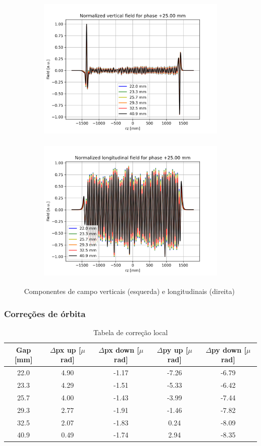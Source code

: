 \documentclass[a4paper,12pt]{article}
\begin{document}
\begin{figure}[H]
\begin{subfigure}{0.5\textwidth}
\includegraphics[width=0.9\linewidth, height=7cm]{figs/phase25 By.png} 
\label{fig:subim125}
\end{subfigure}
\begin{subfigure}{0.5\textwidth}
\includegraphics[width=0.9\linewidth, height=7cm]{figs/phase25 Bz.png}
\label{fig:subim225}
\end{subfigure}
\caption{Componentes de campo verticais (esquerda) e longitudinais (direita)}
\label{fig:by_bz_25}
\end{figure}

\subsubsection{Correções de órbita}

\begin{table}[H]
\centering
\caption{Tabela de correção local}
\begin{tabular}{|c|c|c|c|c|}
\hline
Gap {[}mm{]} & $\Delta$px up {[}$\mu$rad{]} & $\Delta$px down {[}$\mu$rad{]} & $\Delta$py up {[}$\mu$rad{]} & $\Delta$py down {[}$\mu$rad{]} \\ \hline
22.0 & 4.90 & -1.17 & -7.26 & -6.79 \\ \hline
23.3 & 4.29  & -1.51 & -5.33 & -6.42 \\ \hline
25.7 & 4.00  & -1.43 & -3.99 & -7.44 \\ \hline
29.3 & 2.77  & -1.91 & -1.46 & -7.82 \\ \hline
32.5 &  2.07 & -1.83 & 0.24 & -8.09  \\ \hline
40.9 & 0.49  & -1.74 & 2.94 & -8.35 \\ \hline
\end{tabular}
\label{tab:corff25}
\end{table}
\end{document}
